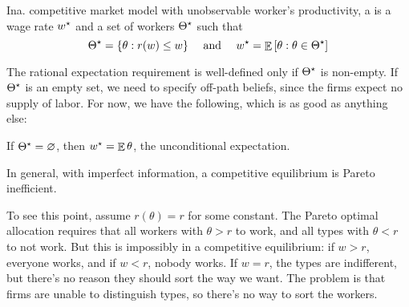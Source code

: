 \documentclass[12pt]{article}
\begin{document}
\begin{definition}
	Ina. competitive market model with unobservable worker's productivity, a  is a wage rate $w^\star$ and a set of workers $\Theta^\star$ such that
	\[
	\Theta^\star = \{\theta : r(w) \le w\} \quad \text{ and } \quad w^\star = \mathop{\mathbb{E}}\left[ \theta : \theta \in \Theta^\star\right] 
	\]
\end{definition}

\begin{remark}
	The rational expectation requirement is well-defined only if $\Theta^\star$ is non-empty. If $\Theta^\star$ is an empty set, we need to specify off-path beliefs, since the firms expect no supply of labor. For now, we have the following, which is as good as anything else:
\end{remark}
\begin{assumption}
	If $\Theta^\star = \mathop{\varnothing}$, then $w^\star = \mathop{\mathbb{E}} \theta$, the unconditional expectation.
\end{assumption}

\begin{remark}
	In general, with imperfect information, a competitive equilibrium is Pareto inefficient. 
\end{remark}

\begin{example}
	To see this point, assume $r(\theta) = r$ for some constant. The Pareto optimal allocation requires that all workers with $\theta > r$ to work, and all types with $\theta < r$ to not work. But this is impossibly in a competitive equilibrium: if $w > r$, everyone works, and if $w < r$, nobody works. If $w = r$, the types are indifferent, but there's no reason they should sort the way we want. The problem is that firms are unable to distinguish types, so there's no way to sort the workers.
\end{example}
\end{document}
